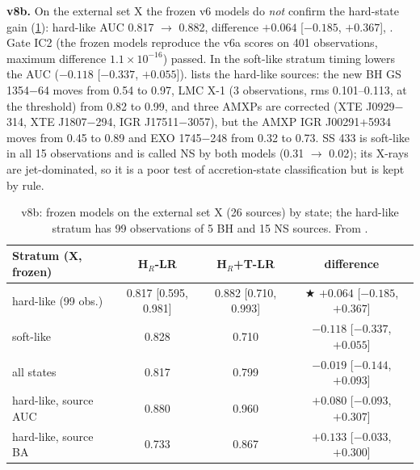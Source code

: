 \Primary{} \textbf{v8b.} On the external set X the frozen v6 models do \emph{not} confirm the hard-state gain
(\cref{tab:p4v8b}): hard-like AUC 0.817 $\to$ 0.882, difference $+0.064$ [$-0.185$, $+0.367$], \NotDetected. Gate IC2 (the
frozen models reproduce the v6a scores on 401 observations, maximum difference $1.1\times10^{-16}$) passed. In the soft-like
stratum timing lowers the AUC ($-0.118$ [$-0.337$, $+0.055$]).  lists the hard-like sources: the new
BH GS 1354$-$64 moves from 0.54 to 0.97, LMC X-1 (3 observations, rms 0.101--0.113, at the threshold) from 0.82 to 0.99, and
three AMXPs are corrected (XTE J0929$-$314, XTE J1807$-$294, IGR J17511$-$3057), but the AMXP IGR J00291+5934 moves from 0.45
to 0.89 and EXO 1745$-$248 from 0.32 to 0.73. SS 433 is soft-like in all 15 observations and is called NS by both models
(0.31 $\to$ 0.02); its X-rays are jet-dominated, so it is a poor test of accretion-state classification but is kept by rule.

\begin{table}[htbp]
\centering\small
\caption[External hard-like stratum]{\Primary{} v8b: frozen models on the external set X (26 sources) by state; the hard-like
stratum has 99 observations of 5 BH and 15 NS sources. From
.}
\label{tab:p4v8b}
\footnotesize\setlength{\tabcolsep}{4pt}
\begin{tabular}{@{}lccc@{}}
\toprule
Stratum (X, frozen) & H$_R$-LR & H$_R$+T-LR & difference \\
\midrule
hard-like (99 obs.) & 0.817 [0.595, 0.981] & 0.882 [0.710, 0.993] & $\bigstar$ $+0.064$ [$-0.185$, $+0.367$] \\
soft-like & 0.828 & 0.710 & $-0.118$ [$-0.337$, $+0.055$] \\
all states & 0.817 & 0.799 & $-0.019$ [$-0.144$, $+0.093$] \\
hard-like, source AUC & 0.880 & 0.960 & $+0.080$ [$-0.093$, $+0.307$] \\
hard-like, source BA & 0.733 & 0.867 & $+0.133$ [$-0.033$, $+0.300$] \\
\bottomrule
\end{tabular}
\end{table}

